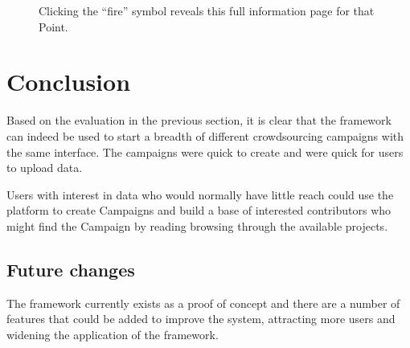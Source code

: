 \documentclass{article}
\let\oldsection\section
\renewcommand\section{\clearpage\oldsection}
\begin{document}
		\begin{figure}[ht]
			\centering
			\caption{Clicking the ``fire'' symbol reveals this full information page for that Point.}
			\label{fig:eval-submita-4}
		\end{figure}

	\section{Conclusion}
	\label{sec:conclusion}

		Based on the evaluation in the previous section, it is clear that the framework can indeed be used to start a breadth of different crowdsourcing campaigns with the same interface. The campaigns were quick to create and were quick for users to upload data.

		Users with interest in data who would normally have little reach could use the platform to create Campaigns and build a base of interested contributors who might find the Campaign by reading browsing through the available projects.

		\subsection{Future changes}

		The framework currently exists as a proof of concept and there are a number of features that could be added to improve the system, attracting more users and widening the application of the framework.
\end{document}
